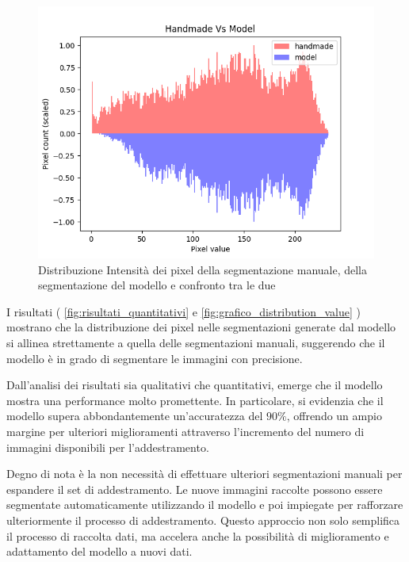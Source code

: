 \begin{figure}[!ht]
\begin{minipage}{0.32\textwidth}
	\end{minipage}
	\hfill %
	\begin{minipage}{0.32\textwidth}
		\centering
		\includegraphics[width=\columnwidth]{Immagini/handmade_vs_model_scaled.png}
	\end{minipage}
	\caption{Distribuzione Intensità dei pixel della segmentazione manuale, della segmentazione del modello e confronto tra le due}
	\label{fig:grafico_distribution_value}
\end{figure}


I risultati ( \autoref{fig:risultati_quantitativi} e \autoref{fig:grafico_distribution_value} ) mostrano che la distribuzione dei pixel nelle segmentazioni generate dal modello si
allinea strettamente a quella delle segmentazioni manuali, suggerendo che il modello è in grado di
segmentare le immagini con precisione.


Dall'analisi dei risultati sia qualitativi che quantitativi, emerge che il modello mostra una
performance molto promettente. In particolare, si evidenzia che il modello supera abbondantemente
un'accuratezza del $90\%$, offrendo un ampio margine per ulteriori miglioramenti attraverso
l'incremento del numero di immagini disponibili per l'addestramento.

Degno di nota è la non necessità di effettuare ulteriori segmentazioni manuali per espandere il set
di addestramento. Le nuove immagini raccolte possono essere segmentate automaticamente utilizzando il
modello e poi impiegate per rafforzare ulteriormente il processo di addestramento. Questo approccio
non solo semplifica il processo di raccolta dati, ma accelera anche la possibilità di miglioramento
e adattamento del modello a nuovi dati.


